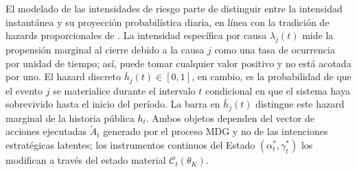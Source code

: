 \documentclass[review,authoryear,12pt]{elsarticle}
\theoremstyle{plain}
\theoremstyle{definition}
\newcommand{\1}{\mathbf{1}}
\begin{document}
El modelado de las intensidades de riesgo parte de distinguir entre la intensidad instantánea y su proyección probabilística diaria, en línea con la tradición de hazards proporcionales de \citet{Cox1972}. La intensidad específica por causa $\lambda_j(t)$ mide la propensión marginal al cierre debido a la causa $j$ como una tasa de ocurrencia por unidad de tiempo; así, puede tomar cualquier valor positivo y no está acotada por uno. El hazard discreto $\bar h_j(t)\in[0,1]$, en cambio, es la probabilidad de que el evento $j$ se materialice durante el intervalo $t$ condicional en que el sistema haya sobrevivido hasta el inicio del período. La barra en $\bar h_j(t)$ distingue este hazard marginal de la historia pública $h_t$. Ambos objetos dependen del vector de acciones ejecutadas $\tilde{A}_t$ generado por el proceso MDG y no de las intenciones estratégicas latentes; los instrumentos continuos del Estado $(\alpha_t^\ast,\gamma_t^\ast)$ los modifican a través del estado material $\mathcal{C}_t(\theta_K)$.
\end{document}
